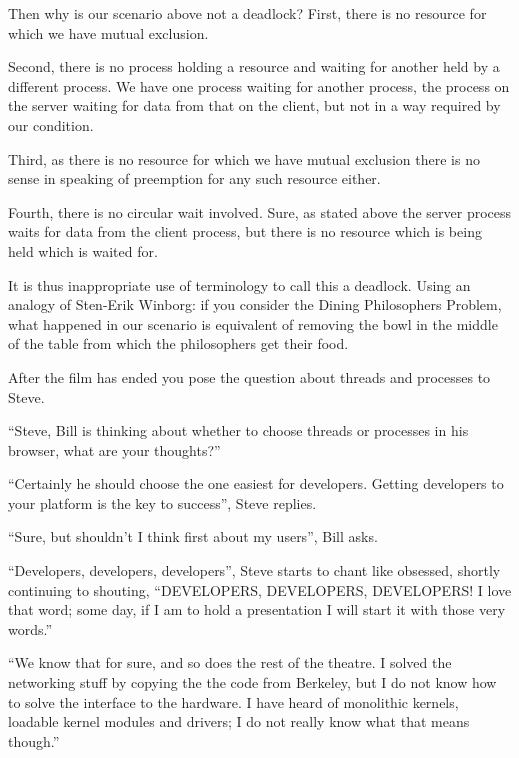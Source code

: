 \documentclass[addpoints]{miunexam}
\begin{document}
\begin{questions}
\begin{solution}
    Then why is our scenario above not a deadlock?
    First, there is no resource for which we have mutual exclusion.

    Second, there is no process holding a resource and waiting for another held 
    by a different process.
    We have one process waiting for another process, the  process 
    on the server waiting for data from that on the client, but not in a way 
    required by our condition.

    Third, as there is no resource for which we have mutual exclusion there is 
    no sense in speaking of preemption for any such resource either.

    Fourth, there is no circular wait involved.
    Sure, as stated above the server process waits for data from the client 
    process, but there is no resource which is being held which is waited for.

    It is thus inappropriate use of terminology to call this a deadlock.
    Using an analogy of Sten-Erik Winborg: if you consider the Dining 
    Philosophers Problem, what happened in our scenario is equivalent of 
    removing the bowl in the middle of the table from which the philosophers 
    get their food.
  \end{solution}

  \question\label{q:drivers}
  After the film has ended you pose the question about threads and processes to 
  Steve.

  ``Steve, Bill is thinking about whether to choose threads or processes in his 
  browser, what are your thoughts?''

  ``Certainly he should choose the one easiest for developers.
  Getting developers to your platform is the key to success'', Steve replies.

  ``Sure, but shouldn't I think first about my users'', Bill asks.

  ``Developers, developers, developers'', Steve starts to chant like obsessed, 
  shortly continuing to shouting, ``DEVELOPERS, DEVELOPERS, DEVELOPERS!
  I love that word; some day, if I am to hold a presentation I will start it 
  with those very words.''

  ``We know that for sure, and so does the rest of the theatre.
  I solved the networking stuff by copying the the code from Berkeley, but I do 
  not know how to solve the interface to the hardware.
  I have heard of monolithic kernels, loadable kernel modules and drivers; I do 
  not really know what that means though.''


\end{questions}
\end{document}
